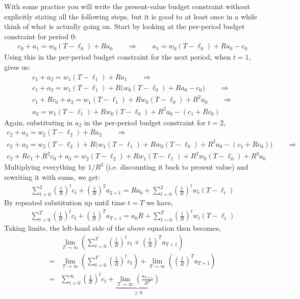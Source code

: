 \documentclass{scrartcl}
\newcommand{\lep}{\left(}
\newcommand{\rip}{\right)}
\begin{document}
With some practice you will write the present-value budget constraint without explicitly stating all the following steps, but it is good to at least once in a while think of what is actually going on. Start by looking at the per-period budget constraint for period $0$: 
\begin{gather*}
	c_0 + a_1 = w_0(T-\ell_0) + Ra_0 \qquad \Rightarrow \qquad
	a_1 = w_0(T-\ell_0) + Ra_0 - c_0
\end{gather*}
Using this in the per-period budget constraint for the next period, when $t=1$, gives us: 
\begin{gather*}
	c_1 + a_2 = w_1(T-\ell_1) + Ra_1 \qquad \Rightarrow \qquad \\
	c_1 + a_2 = w_1(T-\ell_1) + R\big( w_0(T-\ell_0) + Ra_0 - c_0 \big) \qquad \Rightarrow \\
	c_1 + Rc_0 + a_2 = w_1(T-\ell_1) + R w_0(T-\ell_0) + R^2a_0 \qquad \Rightarrow \\
	a_2 = w_1(T-\ell_1) + R w_0(T-\ell_0) + R^2a_0 - (c_1 + Rc_0)
\end{gather*}
Again, substituting in $a_2$ in the per-period budget constraint for $t=2$, 
\begin{gather*}
	c_2 + a_3 = w_2(T-\ell_2) + Ra_2 \qquad \Rightarrow \qquad \\
	c_2 + a_3 = w_2(T-\ell_2) + R\Big( w_1(T-\ell_1) + R w_0(T-\ell_0) + R^2a_0 - (c_1 + Rc_0) \Big) \qquad \Rightarrow \\
	c_2 + Rc_1 + R^2c_0 + a_3 = w_2(T-\ell_2) + Rw_1(T-\ell_1) + R^2 w_0(T-\ell_0) + R^3a_0 
\end{gather*}
Multiplying everything by $1/R^2$ (i.e. discounting it back to present value) and rewriting it with sums, we get: 
\begin{align*}
	\sum_{t=0}^{2} \lep\frac{1}{R} \rip^t c_t + \lep\frac{1}{R} \rip^2 a_{2+1} = R a_0 + \sum_{t=0}^{2} \lep\frac{1}{R} \rip^t w_t(T-\ell_t)
\end{align*}
By repeated substitution up until time $t=T$ we have, 
\begin{align*}
	\sum_{t=0}^{T} \lep\frac{1}{R} \rip^t c_t + \lep\frac{1}{R} \rip^T a_{T+1} = a_0 R + \sum_{t=0}^{T} \lep\frac{1}{R} \rip^t w_t(T-\ell_t)
\end{align*}
Taking limits, the left-hand side of the above equation then becomes, 
\begin{align*}
	& \lim_{T\rightarrow \infty} \lep \sum_{t=0}^{T} \lep\frac{1}{R} \rip^t c_t + \lep\frac{1}{R} \rip^T a_{T+1} \rip \\
	=& \lim_{T\rightarrow \infty} \lep \sum_{t=0}^{T} \lep\frac{1}{R} \rip^t c_t \rip +   
	\lim_{T\rightarrow \infty} \lep \lep \frac{1}{R} \rip^T a_{T+1} \rip \\
	=& \sum_{t=0}^{\infty} \lep\frac{1}{R} \rip^t c_t +   
	\underbrace{\lim_{T \rightarrow \infty} \lep \frac{a_{T+1}}{R^T} \rip}_{\geq 0}   
\end{align*}
\end{document}
